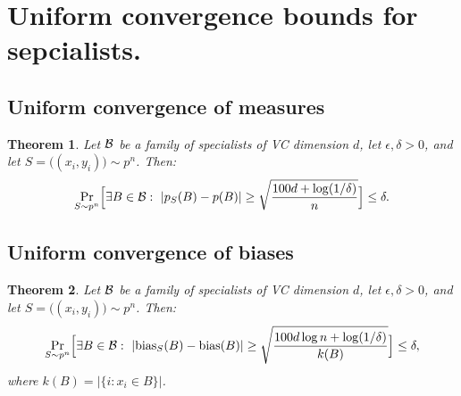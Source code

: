 \documentclass{article}
\newtheorem{theorem}{Theorem}[section]
\newcommand{\B}{{\cal B}}
\newcommand{\bias}{\text{bias}}
\newcommand{\samp}{S}
\newcommand{\eps}{\epsilon}
\begin{document}
\section{Uniform convergence bounds for sepcialists.}
\subsection{Uniform convergence of measures}

\begin{theorem}\label{thm:uc1}
Let $\B$ be a family of specialists of VC dimension $d$,
let $\eps,\delta>0$, 
and let $S=\bigl((x_i,y_i)\bigr) \sim p^n$. Then:
\[\Pr_{\samp\sim p^n}\Bigl[\exists {B\in\B}:~\lvert p_{\samp}(B) -  p(B)\rvert \geq \sqrt{\frac{100d + \log(1/\delta)}{n}} \Bigr] \leq \delta.
\]
\end{theorem}

\subsection{Uniform convergence of biases}
\begin{theorem}
Let $\B$ be a family of specialists of VC dimension $d$, 
let $\eps,\delta>0$,
and let $S=\bigl((x_i,y_i)\bigr) \sim p^n$.
Then:
\[\Pr_{\samp\sim p^n}\Bigl[\exists {B\in\B}:~\lvert \bias_{\samp}(B) -  \bias(B)\rvert \geq \sqrt{\frac{100d\log n + \log(1/\delta)}{k(B)} }\Bigr] \leq \delta,
\]
where $k(B) = \lvert\{ i : x_i\in B \}\rvert$.
\end{theorem}
\end{document}
